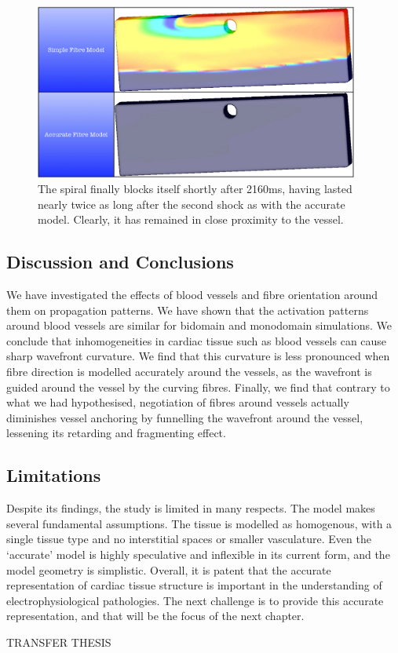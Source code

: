     \begin{figure}[htbp]
  		\centering
  	    \includegraphics[width=0.95\textwidth]{Ch5/Figs/shock_induced_2160ms}
              \caption{The spiral finally blocks itself shortly after 2160ms, having lasted nearly twice as long after the second shock as with the accurate model. Clearly, it has remained in close proximity to the vessel.}
  	  \label{fig:shock_induced_2160ms}
  	\end{figure}
      

\subsection{Discussion and Conclusions} %
\label{sec:discussion_and_conclusions}
  We have investigated the effects of blood vessels and fibre orientation around them on propagation patterns. We have shown that the activation patterns around blood vessels are similar for bidomain and monodomain simulations. We conclude that inhomogeneities in cardiac tissue such as blood vessels can cause sharp wavefront curvature. We find that this curvature is less pronounced when fibre direction is modelled accurately around the vessels, as the wavefront is guided around the vessel by the curving fibres. Finally, we find that contrary to what we had hypothesised, negotiation of fibres around vessels actually diminishes vessel anchoring by funnelling the wavefront around the vessel, lessening its retarding and fragmenting effect.


\subsection{Limitations} %
\label{sec:limitations}
Despite its findings, the study is limited in many respects. The model makes several fundamental assumptions. The tissue is modelled as homogenous, with a single tissue type and no interstitial spaces or smaller vasculature. Even the ‘accurate’ model is highly speculative and inflexible in its current form, and the model geometry is simplistic. Overall, it is patent that the accurate representation of cardiac tissue structure is important in the understanding of electrophysiological pathologies. The next challenge is to provide this accurate representation, and that will be the focus of the next chapter.


TRANSFER THESIS
